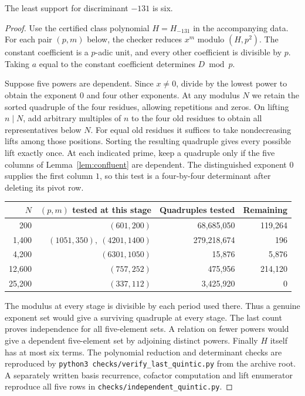 \begin{theorem}\label{thm:131}
The least support for discriminant $-131$ is six.
\end{theorem}
\begin{proof}
Use the certified class polynomial $H=H_{-131}$ in the accompanying data.
For each pair $(p,m)$ below, the checker reduces $x^m$ modulo
$(H,p^2)$. The constant coefficient is a $p$-adic unit, and every
other coefficient is divisible by $p$. Taking $a$ equal to the constant
coefficient determines $D\bmod p$.

Suppose five powers are dependent. Since $x\ne0$, divide by the lowest
power to obtain the exponent $0$ and four other exponents. At any
modulus $N$ we retain the sorted quadruple of the four residues, allowing
repetitions and zeros. On lifting $n\mid N$, add arbitrary multiples of
$n$ to the four old residues to obtain all representatives below $N$.
For equal old residues it suffices to take nondecreasing lifts among
those positions. Sorting the resulting quadruple gives every possible
lift exactly once. At each indicated prime, keep a quadruple only if the
five columns of Lemma~\ref{lem:confluent} are dependent. The distinguished
exponent $0$ supplies the first column $1$, so this test is a
four-by-four determinant after deleting its pivot row.
\begin{center}\small
\begin{tabular}{rrrr}
\toprule
$N$ & $(p,m)$ tested at this stage & Quadruples tested & Remaining\\
\midrule
200    & $(601,200)$                    &68,685,050 &119,264\\
1,400  & $(1051,350),\ (4201,1400)$      &279,218,674&196\\
4,200  & $(6301,1050)$                  &15,876     &5,876\\
12,600 & $(757,252)$                    &475,956    &214,120\\
25,200 & $(337,112)$                    &3,425,920  &0\\
\bottomrule
\end{tabular}
\end{center}
The modulus at every stage is divisible by each period used there.
Thus a genuine exponent set would give a surviving quadruple at every
stage. The last count proves independence for all five-element sets.
A relation on fewer powers would give a dependent five-element set by
adjoining distinct powers. Finally $H$ itself has at most six terms.
The polynomial reduction and determinant checks are reproduced by
\texttt{python3 checks/verify\_last\_quintic.py} from the archive root.
A separately written basis recurrence, cofactor computation and lift enumerator reproduce all five rows in \texttt{checks/independent\_quintic.py}.
\end{proof}

